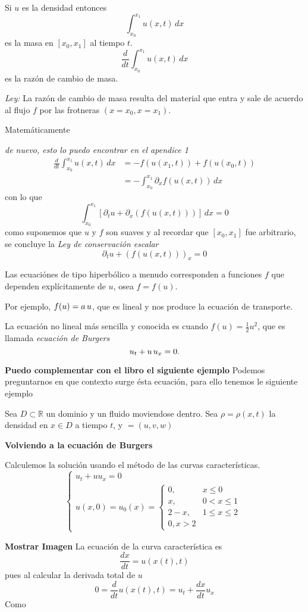 Si $u$ es la densidad entonces
\[
\int_{x_0}^{x_1} u(x,t) \,dx
\]
es la masa en $[x_0, x_1]$ al tiempo $t$.
\[
\frac{d}{dt} \int_{x_0}^{x_1} u(x,t) \,dx
\]
es la razón de cambio de masa.

\textit{Ley: } La razón de cambio de masa resulta del material que entra y sale de acuerdo al flujo $f$ por las frotneras $(x=x_0, x=x_1)$.

Matemáticamente

\textit{de nuevo, esto lo puedo encontrar en el apendice 1}
\begin{align*}
\frac{d}{dt} \int_{x_0}^{x_1} u(x,t) \,dx &= -f(u(x_1,t)) + f(u(x_0, t)) \\
			&= - \int_{x_0}^{x_1} \partial_x f(u(x,t)) \,dx	
\end{align*}
con lo que
\[
\int_{x_0}^{x_1} \left[ \partial_t u + \partial_x(f(u(x,t))) \right] \,dx = 0
\]
como suponemos que $u$ y $f$ son suaves y al recordar que $[x_0, x_1]$ fue arbitrario, se concluye la \textit{Ley de conservación escalar}
\[
\partial_t u + (f(u(x,t)))_x = 0
\]

Las ecuaciónes de tipo hiperbólico a menudo corresponden a funciones $f$ que dependen explícitamente de $u$, osea $f = f(u)$.

Por ejemplo, $f(u) = a \thinspace u$, que es lineal y nos produce la ecuación de transporte.

La ecuación no lineal más sencilla y conocida es cuando $f(u) = \frac{1}{2} u^2$, que es llamada \textit{ecuación de Burgers}
\[
u_t + u \thinspace u_x = 0.
\]


\textbf{Puedo complementar con el libro el siguiente ejemplo}
Podemos preguntarnos en que contexto surge ésta ecuación, para ello tenemos le siguiente ejemplo

Sea $D \subset \mathbb{R}$ un dominio y un fluido moviendose dentro. Sea $\rho = \rho(x,t)$ la densidad en $x \in D$ a tiempo $t$, y $ = (u, v, w)$


\textbf{Volviendo a la ecuación de Burgers}

Calculemos la solución usando el método de las curvas características.
\[
\begin{cases}
u_t + u u_x = 0 \\
u(x,0) = u_0(x) = \begin{cases}
				  0, & x\leq0 \\
				  x, & 0<x\leq 1 \\
				  2-x, & 1\leq x \leq 2 \\
				  0, x>2
				  \end{cases}
\end{cases}
\]

\textbf{Mostrar Imagen}
La ecuación de la curva característica es
\[
\frac{dx}{dt} = u(x(t), t)
\]
pues al calcular la derivada total de $u$
\[
0 = \frac{d}{dt} u(x(t), t) = u_t + \frac{dx}{dt} u_x
\]
Como 


